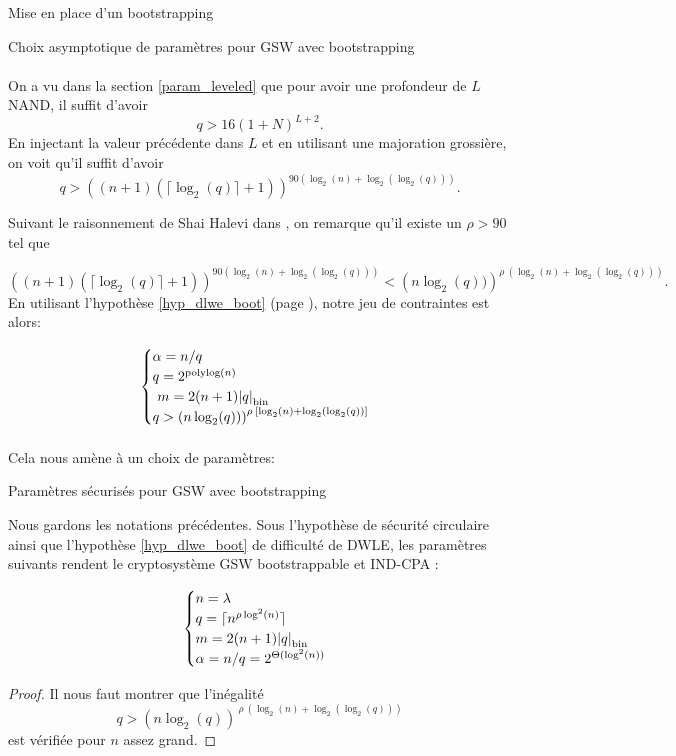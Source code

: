 \begin{section}{Mise en place d'un bootstrapping}
\begin{subsection}{Choix asymptotique de paramètres pour GSW avec bootstrapping}
\paragraph{}
On a vu dans la section \ref{param_leveled} que pour avoir une
profondeur de $L$ NAND, il suffit d'avoir
\begin{equation*}
q > 16 {(1+N)}^{L+2}.
\end{equation*}
En injectant la valeur précédente dans $L$ et en utilisant une majoration
grossière, on voit qu'il suffit d'avoir
\begin{equation}
q > {\left((n+1)(\lceil \log_2(q) \rceil + 1 )\right)}^{90 \left(\log_2(n) +
\log_2(\log_2(q))\right)}.
\end{equation}

Suivant le raisonnement de Shai Halevi dans \cite{halevi}, on remarque 
qu'il existe un $\rho > 90$ tel que 

\begin{equation*}
{\left((n+1)(\lceil \log_2(q) \rceil + 1 )\right)}^{90 \left(\log_2(n) +
\log_2(\log_2(q))\right)} < 
{\left(n\log_2(q))\right)}^{\rho\:\left(\log_2(n) + \log_2(\log_2(q))\right)}.
\end{equation*}
En utilisant l'hypothèse  \ref{hyp_dlwe_boot} (page \pageref{hyp_dlwe_boot}), notre jeu de contraintes est alors:

\[ \begin{cases}
\alpha  = n /q \\
	q = 2^\text{polylog$(n)$}\\ 
	m = 2(n+1) \bnorm{q} \\  
	q > {\left(n\log_2(q))\right)}^{\rho\: \left[\log_2(n) + \log_2(\log_2(q))\right]}
	\end{cases} \]

\paragraph{}
Cela nous amène à un choix de paramètres:
\begin{thm}{Paramètres sécurisés pour GSW avec bootstrapping}

Nous gardons les notations précédentes.
Sous l'hypothèse de sécurité circulaire ainsi que l'hypothèse \ref{hyp_dlwe_boot} de difficulté de DWLE, les paramètres
suivants rendent le cryptosystème GSW bootstrappable et IND-CPA :

\[ \begin{cases}
 	n = \lambda \\
	q = \lceil n^{\rho \log^2(n)}\rceil \\
	m = 2(n+1) \bnorm{q} \\  
	\alpha = n/q = 2^{\Theta(\log^2(n))}
	\end{cases} \]
\end{thm}
\begin{proof}
Il nous faut montrer que l'inégalité 
	\[ q > {\left(n\log_2(q)\right)}^{\:\rho\:\left(\log_2(n) + \log_2(\log_2(q))\right)} \]
est vérifiée pour $n$ assez grand.


\end{proof}
\end{subsection}
\end{section}
